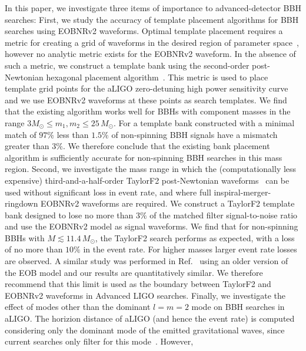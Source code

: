 In this paper, we investigate three items of importance to advanced-detector
BBH searches: First, we study the accuracy of template placement algorithms
for BBH searches using EOBNRv2 waveforms. Optimal template placement requires
a metric for creating a grid of waveforms in the desired region of parameter
space~\citep{OwenTemplateSpacing}, however no analytic metric exists for the
EOBNRv2 waveform. In the absence of such a metric, we construct a template
bank using the second-order post-Newtonian hexagonal placement
algorithm~\citep{SathyaBankPlacementTauN,BabaketalBankPlacement,SathyaMetric2PN,Cokelaer:2007kx}.
This metric is used to place template grid points for the aLIGO zero-detuning
high power sensitivity curve~\citep{aLIGONoiseCurve} and we use EOBNRv2
waveforms at these points as search templates.  We find that the existing
algorithm works well for BBHs with component masses in the range $3 M_\odot
\le m_1, m_2 \le 25\, M_\odot$.  For a template bank constructed with a
minimal match of $97\%$ less than $1.5\%$ of non-spinning BBH signals have a
mismatch greater than $3\%$. We therefore conclude that the existing bank
placement algorithm is sufficiently accurate for non-spinning BBH searches in
this mass region.  Second, we investigate the mass range in which the
(computationally less expensive) third-and-a-half-order TaylorF2
post-Newtonian
waveforms~\citep{Sathyaprakash:1991mt,Cutler:1994ys,Droz:1999qx,PNFluxEnergy3PN01,PNFluxEnergy3PN02,Jaranowski:1999qd,Jaranowski:1999ye,Damour:2001bu,KidderPN,Blanchet3PN}
can be used without significant loss in event rate, and where full
inspiral-merger-ringdown EOBNRv2 waveforms are required. We construct a
TaylorF2 template bank designed to lose no more than $3\%$ of the matched
filter signal-to-noise ratio and use the EOBNRv2 model as signal waveforms.
We find that for non-spinning BBHs with $M \lesssim 11.4\,M_{\odot}$, the
TaylorF2 search performs as expected, with a loss of no more than $10\%$ in
the event rate. For higher masses larger event rate losses are observed. A
similar study was performed in Ref.~\citep{CompTemplates2009} using an older
version of the EOB model and our results are quantitatively similar. We
therefore recommend that this limit is used as the boundary between TaylorF2
and EOBNRv2 waveforms in Advanced LIGO searches.  Finally, we investigate the
effect of modes other than the dominant $l = m = 2$ mode on BBH searches in
aLIGO.  The horizion distance of aLIGO (and hence the event rate) is computed
considering only the dominant mode of the emitted gravitational waves, since
current searches only filter for this mode~\citep{LSCCBCRates2010}. However,
